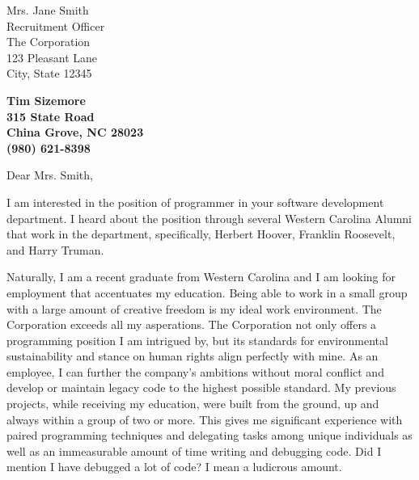 \documentclass[11pt]{letter} %
\begin{document}

\begin{letter}{Mrs. Jane Smith \\
Recruitment Officer \\
The Corporation \\
123 Pleasant Lane \\
City, State 12345} 


\begin{center}
\large\bf Tim Sizemore \\ %
315 State Road \\ China Grove, NC 28023 \\ (980) 621-8398 %
\end{center} 
\vfill

\signature{Tim Sizemore} %


\opening{Dear Mrs. Smith,} 
 
I am interested in the position of programmer in your software development 
department. I heard about the position through several Western Carolina Alumni
that work in the department, specifically, Herbert Hoover, Franklin Roosevelt, 
and Harry Truman.

Naturally, I am a recent graduate from Western Carolina and I am looking for 
employment that accentuates my education. Being able to work in a small group
with a large amount of creative freedom is my ideal work environment. The 
Corporation exceeds all my asperations. The Corporation not only offers a 
programming position I am intrigued by, but its standards for environmental 
sustainability and stance on human rights align perfectly with mine. As an 
employee, I can further the company's ambitions without moral conflict and 
develop or maintain legacy code to the highest possible standard. My previous 
projects, while receiving my education, were built from the ground, up and 
always within a group of two or more. This gives me significant experience with
paired programming techniques and delegating tasks among unique individuals as 
well as an immeasurable amount of time writing and debugging code. Did I mention
I have debugged a lot of code? I mean a ludicrous amount.


\end{letter}
\end{document}
